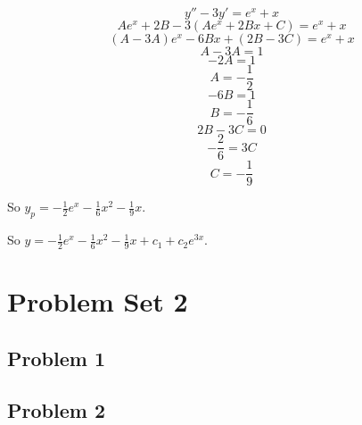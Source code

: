 \documentclass[titlepage]{article}
\begin{document}
$$y'' - 3y' = e^x + x$$
$$Ae^x + 2B - 3(Ae^x + 2Bx + C) = e^x + x$$
$$(A- 3A)e^x - 6Bx + (2B - 3C) = e^x + x$$
$$A - 3A = 1$$
$$-2A = 1$$
$$A = -\frac{1}{2}$$
$$-6B = 1$$
$$B = -\frac{1}{6}$$
$$2B - 3C = 0$$
$$-\frac{2}{6} = 3C$$
$$C = -\frac{1}{9}$$

So $y_p = -\frac{1}{2}e^x -\frac{1}{6}x^2 - \frac{1}{9}x$.

So $y = -\frac{1}{2}e^x -\frac{1}{6}x^2 - \frac{1}{9}x + c_1 + c_2e^{3x}$.

\section{Problem Set 2}
\subsection{Problem 1}
\subsection{Problem 2}
\end{document}
